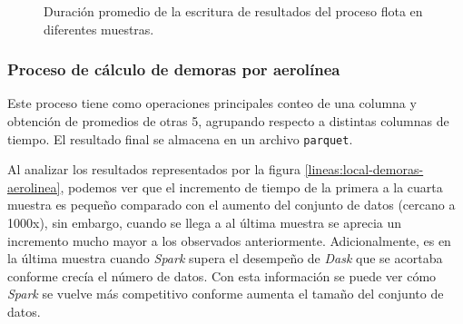 \begin{figure}
\centering
{}
\caption{Duración promedio de la escritura de resultados del proceso flota en diferentes muestras.}
\label{lineas:local-flota-write}
\end{figure}

\subsubsection{Proceso de cálculo de demoras por aerolínea}

Este proceso tiene como operaciones principales conteo de una columna y obtención de promedios de otras 5, agrupando respecto a distintas columnas de tiempo. El resultado final se almacena en un archivo \texttt{parquet}.

Al analizar los resultados representados por la figura \ref{lineas:local-demoras-aerolinea}, podemos ver que el incremento de tiempo de la primera a la cuarta muestra es pequeño comparado con el aumento del conjunto de datos (cercano a 1000x), sin embargo, cuando se llega a al última muestra se aprecia un incremento mucho mayor a los observados anteriormente. Adicionalmente, es en la última muestra cuando \textit{Spark} supera el desempeño de \textit{Dask} que se acortaba conforme crecía el número de datos. Con esta información se puede ver cómo \textit{Spark} se vuelve más competitivo conforme aumenta el tamaño del conjunto de datos. 

